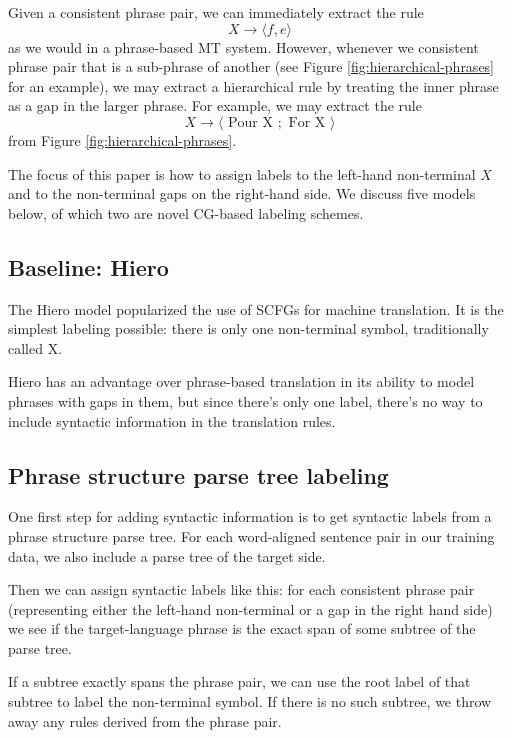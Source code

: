 \documentclass[a4paper]{article}
\begin{document}
Given a consistent phrase pair, we can immediately extract the rule
\begin{equation}
X \to \langle f , e \rangle
\end{equation}
as we would in a phrase-based MT system. However, whenever we consistent phrase pair that is a sub-phrase of another (see Figure \ref{fig:hierarchical-phrases} for an example), we may extract a hierarchical rule by treating the inner phrase as a gap in the larger phrase. For example, we may extract the rule
\begin{equation}
X \to \langle \textrm{ Pour X }; \textrm{ For X } \rangle
\label{eqn:hiero-rule}
\end{equation}
from Figure \ref{fig:hierarchical-phrases}.

The focus of this paper is how to assign labels to the left-hand non-terminal $X$ and to the non-terminal gaps on the right-hand side. We discuss five models below, of which two are novel CG-based labeling schemes.

\subsection{Baseline: Hiero}

The Hiero model \cite{chiang2005} popularized the use of SCFGs for machine translation. It is the simplest labeling possible: there is only one non-terminal symbol, traditionally called X.

Hiero has an advantage over phrase-based translation in its ability to model phrases with gaps in them, but since there's only one label, there's no way to include syntactic information in the translation rules.

\subsection{Phrase structure parse tree labeling}

One first step for adding syntactic information is to get syntactic labels from a phrase structure parse tree. For each word-aligned sentence pair in our training data, we also include a parse tree of the target side.

Then we can assign syntactic labels like this: for each consistent phrase pair (representing either the left-hand non-terminal or a gap in the right hand side) we see if the target-language phrase is the exact span of some subtree of the parse tree.

If a subtree exactly spans the phrase pair, we can use the root label of that subtree to label the non-terminal symbol. If there is no such subtree, we throw away any rules derived from the phrase pair.
\end{document}
